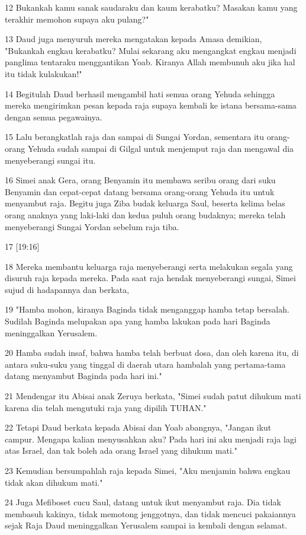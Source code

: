 \par 12 Bukankah kamu sanak saudaraku dan kaum kerabatku? Masakan kamu yang terakhir memohon supaya aku pulang?"
\par 13 Daud juga menyuruh mereka mengatakan kepada Amasa demikian, "Bukankah engkau kerabatku? Mulai sekarang aku mengangkat engkau menjadi panglima tentaraku menggantikan Yoab. Kiranya Allah membunuh aku jika hal itu tidak kulakukan!"
\par 14 Begitulah Daud berhasil mengambil hati semua orang Yehuda sehingga mereka mengirimkan pesan kepada raja supaya kembali ke istana bersama-sama dengan semua pegawainya.
\par 15 Lalu berangkatlah raja dan sampai di Sungai Yordan, sementara itu orang-orang Yehuda sudah sampai di Gilgal untuk menjemput raja dan mengawal dia menyeberangi sungai itu.
\par 16 Simei anak Gera, orang Benyamin itu membawa seribu orang dari suku Benyamin dan cepat-cepat datang bersama orang-orang Yehuda itu untuk menyambut raja. Begitu juga Ziba budak keluarga Saul, beserta kelima belas orang anaknya yang laki-laki dan kedua puluh orang budaknya; mereka telah menyeberangi Sungai Yordan sebelum raja tiba.
\par 17 [19:16]
\par 18 Mereka membantu keluarga raja menyeberangi serta melakukan segala yang disuruh raja kepada mereka. Pada saat raja hendak menyeberangi sungai, Simei sujud di hadapannya dan berkata,
\par 19 "Hamba mohon, kiranya Baginda tidak menganggap hamba tetap bersalah. Sudilah Baginda melupakan apa yang hamba lakukan pada hari Baginda meninggalkan Yerusalem.
\par 20 Hamba sudah insaf, bahwa hamba telah berbuat dosa, dan oleh karena itu, di antara suku-suku yang tinggal di daerah utara hambalah yang pertama-tama datang menyambut Baginda pada hari ini."
\par 21 Mendengar itu Abisai anak Zeruya berkata, "Simei sudah patut dihukum mati karena dia telah mengutuki raja yang dipilih TUHAN."
\par 22 Tetapi Daud berkata kepada Abisai dan Yoab abangnya, "Jangan ikut campur. Mengapa kalian menyusahkan aku? Pada hari ini aku menjadi raja lagi atas Israel, dan tak boleh ada orang Israel yang dihukum mati."
\par 23 Kemudian bersumpahlah raja kepada Simei, "Aku menjamin bahwa engkau tidak akan dihukum mati."
\par 24 Juga Mefiboset cucu Saul, datang untuk ikut menyambut raja. Dia tidak membasuh kakinya, tidak memotong jenggotnya, dan tidak mencuci pakaiannya sejak Raja Daud meninggalkan Yerusalem sampai ia kembali dengan selamat.
